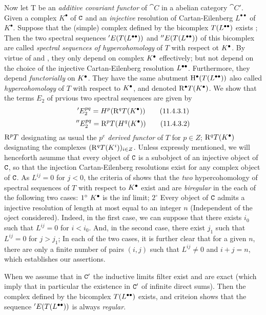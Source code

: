 \begin{env}[11.4.3]
\label{0.11.4.3}
Now let T be an \emph{additive covariant functor} of $\cat{C}$ in a abelian category $\cat{C'}$.
Given a complex $K^\bullet$ of $\mathtt{C}$ and an \emph{injective} resolution of Cartan-Eilenberg $L^{\bullet\bullet}$ of $K^{\bullet}$.
Suppose that the (simple) complex defined by the bicomplex $T({L}^{\bullet\bullet})$ exists ;
Then the two spectral sequences $'E(T({L}^{\bullet\bullet}))$ and $''E(T({L}^{\bullet\bullet}))$ of this bicomplex are called \emph{spectral sequences of hypercohomology} of $T$ with respect ot ${K}^{\bullet}$.
By virtue of  and , they only depend on complex ${K}^{\bullet}$ effectively;
but not depend on the choice of the injective Cartan-Eilenberg resolution ${L}^{\bullet\bullet}$.
Furthermore, they depend \emph{functorially} on ${K}^{\bullet}$.
They have the same abutment ${\mathrm{H}}^{\bullet}(T({L}^{\bullet\bullet}))$ also called \emph{hypercohomology} of $T$ with respect to ${K}^{\bullet}$, and denoted ${\mathrm{R}}^{\bullet} T({K}^{\bullet})$.
We show that the terms $E_2$ of prvious two spectral sequences are given by 
\[
\label{0.11.4.3.1}
  'E_2^{pq} = H^p(\mathrm{R}^q T({K}^{\bullet}))
\tag{11.4.3.1}
\]
\[
\label{0.11.4.3.2}
  ''E_2^{pq} = \mathrm{R}^p T(H^q({K}^{\bullet}))
\tag{11.4.3.2}
\]
$\mathrm{R}^p T$ designating as usual the $p^e$ \emph{derived functor} of $T$ for $p\in Z$;
$\mathrm{R}^q T({K}^{\bullet})$ designating the complexes $(\mathrm{R}^q T(K^i))_{i\in Z}$.
Unless expressly mentioned, we will henceforth asumme that every object of $\mathtt{C}$ is a subobject of an injective object of $\mathtt{C}$,
so that the injection Cartan-Eilenberg resolutions exist for any complex object of $\mathtt{C}$.
As $L^{ij}=0$ for $j<0$, the criteria of  shows that the \emph{two} hypercohomology of spectral sequences of $T$ with respect to ${K}^{\bullet}$ exist 
and are \emph{biregular} in the each of the following two cases:
$1^\circ\ {K}^{\bullet}$ is the inf limit; $2^\circ$ Every object of $\mathtt{C}$ admits a injective resolution of length at most equal to an integer $n$ (Independent of the oject considered).
Indeed, in the first case, we can suppose  that there exists $i_0$ such that $L^{ij}=0$ for $i<i_0$.
And, in the second case, there exist $j_1$ such that $L^{ij}=0$ for $j>j_1$;
In each of the two cases, it is further clear that for a given $n$, there are only a finite number of pairs $(i,j)$ such that $L^{ij}\neq 0$ and $i+j=n$, which establishes our assertions.

When we assume that in $\mathtt{C}'$ the inductive limits filter exist and are exact 
(which imply that in particular the existence in $\mathtt{C}'$ of infinite direct sums).
Then the complex defined by the bicomplex $T({L}^{\bullet\bullet})$ exists, and criteion  shows that the sequence $'E(T({L}^{\bullet\bullet}))$ is always \emph{regular}.


\end{env}

